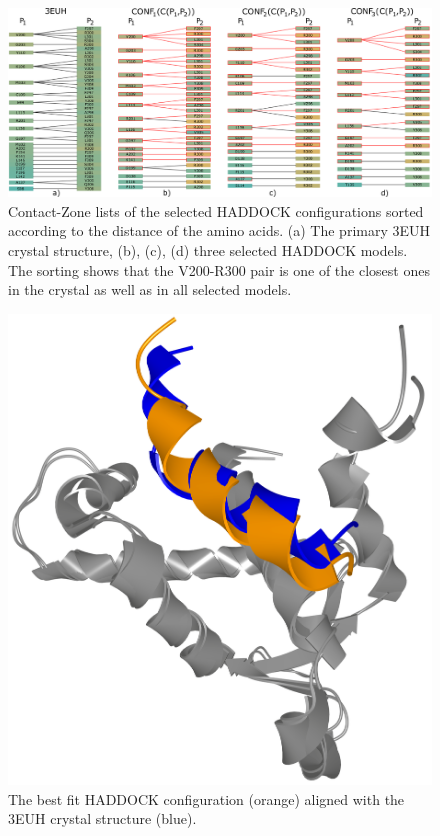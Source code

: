 \documentclass[twocolumn]{bmcart}%
\def\CoZoLists{Contact-Zone lists\xspace}
\begin{document}
\begin{figure}[tb]
    \centering
    \includegraphics[width=1.9\columnwidth]{images/figure16.pdf}
    \caption{ \CoZoLists of the selected HADDOCK configurations sorted according to the distance of the amino acids. (a) The primary 3EUH crystal structure, (b), (c), (d) three selected HADDOCK models. The sorting shows that the V200-R300 pair is one of the closest ones in the crystal as well as in all selected models.}
  \label{fig:list_pocket_string}
\end{figure}

\begin{figure}[h!]
  \centering
  \includegraphics[width=0.65\columnwidth]{images/figure17.png}
  \caption{ The best fit HADDOCK configuration (orange) aligned with the 3EUH crystal structure (blue).}
  \label{fig:MukEF_selection_3_best_pair}
\end{figure}
\end{document}
